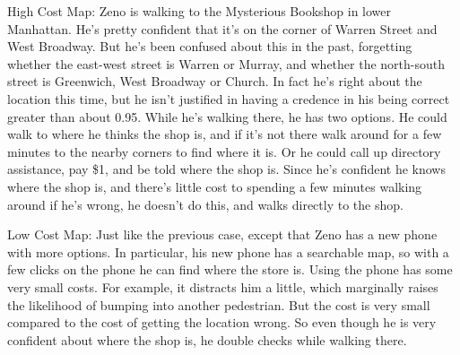 \documentclass[oneside]{book}
\begin{document}
\begin{description*}
\item[High Cost Map:] Zeno is walking to the Mysterious Bookshop in lower Manhattan. He's pretty confident that it's on the corner of Warren Street and West Broadway. But he's been confused about this in the past, forgetting whether the east-west street is Warren or Murray, and whether the north-south street is Greenwich, West Broadway or Church. In fact he's right about the location this time, but he isn't justified in having a credence in his being correct greater than about 0.95. While he's walking there, he has two options. He could walk to where he thinks the shop is, and if it's not there walk around for a few minutes to the nearby corners to find where it is. Or he could call up directory assistance, pay \$1, and be told where the shop is. Since he's confident he knows where the shop is, and there's little cost to spending a few minutes walking around if he's wrong, he doesn't do this, and walks directly to the shop.
\item[Low Cost Map:] Just like the previous case, except that Zeno has a new phone with more options. In particular, his new phone has a searchable map, so with a few clicks on the phone he can find where the store is. Using the phone has some very small costs. For example, it distracts him a little, which marginally raises the likelihood of bumping into another pedestrian. But the cost is very small compared to the cost of getting the location wrong. So even though he is very confident about where the shop is, he double checks while walking there.
\end{description*}
\end{document}
